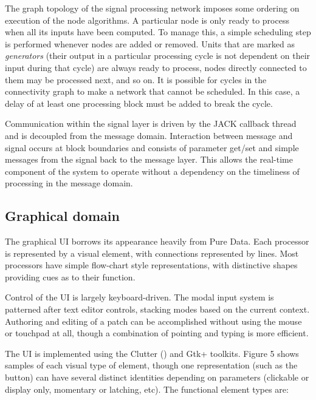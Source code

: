 \documentclass[11pt,a4paper]{article}
\begin{document}
The graph topology of the signal processing network imposes some ordering
on execution of the node algorithms.  A particular node is only ready to
process when all its inputs have been computed.  To manage this, a simple
scheduling step is performed whenever nodes are added or removed.  Units
that are marked as \emph{generators} (their output in a particular
processing cycle is not dependent on their input during that cycle) are
always ready to process, nodes directly connected to them may be processed
next, and so on.  It is possible for cycles in the connectivity graph to
make a network that cannot be scheduled.  In this case, a delay of at least
one processing block must be added to break the cycle. 

Communication within the signal layer is driven by the JACK callback thread
and is decoupled from the message domain.  Interaction between message and
signal occurs at block boundaries and consists of parameter get/set and
simple messages from the signal back to the message layer.  This allows the
real-time component of the system to operate without a dependency on the
timeliness of processing in the message domain.

\subsection{Graphical domain}

The graphical UI borrows its appearance heavily from Pure Data.  Each
processor is represented by a visual element, with connections represented
by lines.  Most processors have simple flow-chart style representations, 
with distinctive shapes providing cues as to their function. 

Control of the UI is largely keyboard-driven.  The modal input system is
patterned after text editor controls, stacking modes based on the current
context.  Authoring and editing of a patch can be accomplished without
using the mouse or touchpad at all, though a combination of pointing and
typing is more efficient.

The UI is implemented using the Clutter (\cite{Clutter}) and Gtk+ toolkits.
Figure 5 shows samples of each visual type of element, though one
representation (such as the button) can have several distinct identities
depending on parameters (clickable or display only, momentary or latching,
etc).  The functional element types are: 
\end{document}
